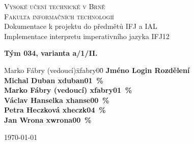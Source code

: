 \begin{titlepage}
\begin{center}
\textsc{{\LARGE Vysoké učení technické v Brně}\\
\smallskip
{\Large Fakulta informačních technologií}}\\
{\Large Dokumentace k projektu do předmětů IFJ a IAL}\\
\medskip
{\Huge Implementace interpretu imperativního jazyka IFJ12}\\
\end{center}
{\bf Tým 034, varianta a/1/II.}
\begin{tabbing}
Marko Fábry (vedoucí)\quad \= xfabry00\quad \= \kill
\bf{Jméno} \>  \bf{Login} \>  \bf{Rozdělení}\\
Michal Duban \> xduban01 \,\%\\
Marko Fábry (vedoucí) \> xfabry01 \,\%\\
Václav Hanselka \> xhanse00 \,\%\\
Petra Heczková \> xheczk04 \,\%\\
Jan Wrona \> xwrona00 \,\%
\end{tabbing}
\hfill \today
\end{titlepage}
